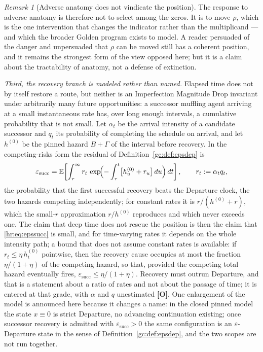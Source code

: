 \documentclass[11pt]{article}
\newcommand{\E}{\mathbb{E}}
\theoremstyle{plain}
\theoremstyle{definition}
\theoremstyle{remark}
\newtheorem{remark}[theorem]{Remark}
\begin{document}
\begin{remark}[Adverse anatomy does not vindicate the position]
The response to adverse anatomy is therefore not to select among the
zeros. It is to move $\rho$, which is the one intervention that changes
the indicator rather than the multiplicand --- and which
the broader Golden program exists to model. A reader persuaded of the danger and
unpersuaded that $\rho$ can be moved still has a coherent position, and
it remains the strongest form of the view opposed here; but it is a
claim about the tractability of anatomy, not a defense of extinction.


\emph{Third, the recovery branch is modeled rather than named.} Elapsed
time does not by itself restore a route, but neither is an Imperfection
Magnitude Drop invariant under arbitrarily many future opportunities: a
successor muffling agent arriving at a small instantaneous rate has,
over long enough intervals, a cumulative probability that is not small.
Let $\alpha_t$ be the arrival intensity of a candidate successor and
$q_t$ its probability of completing the schedule on arrival, and let
$h^{(0)}$ be the pinned hazard $B+\Gamma$ of the interval before
recovery. In the competing-risks form the residual of
Definition~\ref{gc:def:epsdep} is
\begin{equation}\label{hr:eq:epssucc}
\varepsilon_{\mathrm{succ}}
=\E\!\left[\int_\tau^\infty r_t\,
\exp\!\Bigl(-\int_\tau^t\bigl[h^{(0)}_u+r_u\bigr]\,du\Bigr)\,dt\right],
\qquad r_t:=\alpha_tq_t,
\end{equation}
the probability that the first successful recovery beats the Departure
clock, the two hazards competing independently; for constant rates it
is $r/(h^{(0)}+r)$, which the small-$r$ approximation $r/h^{(0)}$
reproduces and which never exceeds one. The claim that deep time does
not rescue the position is then the claim that \eqref{hr:eq:epssucc}
is small, and for time-varying rates it depends on the whole intensity
path; a bound that does not assume constant rates is available: if
$r_t\le\eta\,h^{(0)}_t$ pointwise, then the recovery cause occupies at
most the fraction $\eta/(1+\eta)$ of the competing hazard, so that,
provided the competing total hazard eventually fires,
$\varepsilon_{\mathrm{succ}}\le\eta/(1+\eta)$. Recovery must outrun
Departure, and that is a statement about a ratio of rates and not
about the passage of time; it is entered at that grade, with $\alpha$
and $q$ unestimated \textbf{[O]}. One enlargement of the model is
announced here because it changes a name: in the closed pinned model
the state $x\equiv0$ is strict Departure, no advancing continuation
existing; once successor recovery is admitted with
$\varepsilon_{\mathrm{succ}}>0$ the same configuration is an
$\varepsilon$-Departure state in the sense of
Definition~\ref{gc:def:epsdep}, and the two scopes are not run
together.\end{remark}
\end{document}

